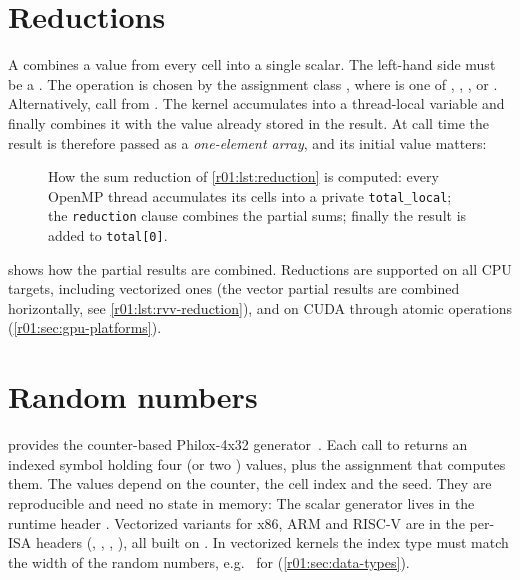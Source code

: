\section{Reductions}\label{r01:sec:reductions}

A  combines a value from every cell into a single scalar. The left-hand
side must be a . The operation is chosen by the assignment class
, where  is one of , ,
,  or . Alternatively, call
 from
.
The kernel accumulates into a thread-local variable and finally combines it with the
value already stored in the result. At call time the result is therefore passed as a
\emph{one-element array}, and its initial value matters:

\begin{figure}[htbp]
  \centering
  
  \caption[An OpenMP sum reduction]{How the sum reduction of \cref{r01:lst:reduction} is computed: every OpenMP thread accumulates its cells into a private \texttt{total\_local}; the \texttt{reduction} clause combines the partial sums; finally the result is added to \texttt{total[0]}.}
  \label{r01:fig:reduction}
\end{figure}
 shows how the partial results are combined. Reductions are
supported on all CPU targets, including vectorized ones (the vector
partial results are combined horizontally, see \cref{r01:lst:rvv-reduction}), and on CUDA
through atomic operations (\cref{r01:sec:gpu-platforms}).

\section{Random numbers}

 provides the counter-based Philox-4x32
generator~\cite{random123}. Each call to  returns an
indexed symbol holding four  (or two ) values, plus the
assignment that computes them. The values depend on the counter, the cell index and the
seed. They are reproducible and need no state in memory:
The scalar generator lives in the runtime header .
Vectorized variants for x86, ARM and RISC-V are in the per-ISA headers (,
, , ), all built on
. In vectorized kernels the index type must match the width of
the random numbers, e.g.\  for 
(\cref{r01:sec:data-types}).

